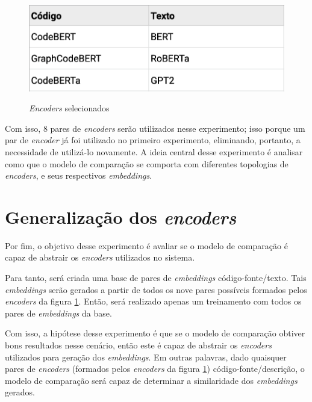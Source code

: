 \begin{figure}[htbp]
    \centering
        \caption{\textit{Encoders} selecionados}
        \includegraphics[scale=0.5]{resources/images/metodologia/encoders-list.png}
        \label{fig:experiments-encoders}
\end{figure}

Com isso, 8 pares de \textit{encoders} serão utilizados nesse experimento; isso porque um par de \textit{encoder} já foi utilizado no primeiro experimento, eliminando, portanto, a necessidade de utilizá-lo novamente. A ideia central desse experimento é analisar como que o modelo de comparação se comporta com diferentes topologias de \textit{encoders}, e seus respectivos \textit{embeddings}.

\section{Generalização dos \textit{encoders}}
\label{sec:experiments:generic_encoder}
Por fim, o objetivo desse experimento é avaliar se o modelo de comparação é capaz de abstrair os \textit{encoders} utilizados no sistema.

Para tanto, será criada uma base de pares de \textit{embeddings} código-fonte/texto. Tais \textit{embeddings} serão gerados a partir de todos os nove pares possíveis formados pelos \textit{encoders} da figura \ref{fig:experiments-encoders}. Então, será realizado apenas um treinamento com todos os pares de \textit{embeddings} da base.

Com isso, a hipótese desse experimento é que se o modelo de comparação obtiver bons resultados nesse cenário, então este é capaz de abstrair os \textit{encoders} utilizados para geração dos \textit{embeddings}. Em outras palavras, dado quaisquer pares de \textit{encoders} (formados pelos \textit{encoders} da figura \ref{fig:experiments-encoders}) código-fonte/descrição, o modelo de comparação será capaz de determinar a similaridade dos \textit{embeddings} gerados.
